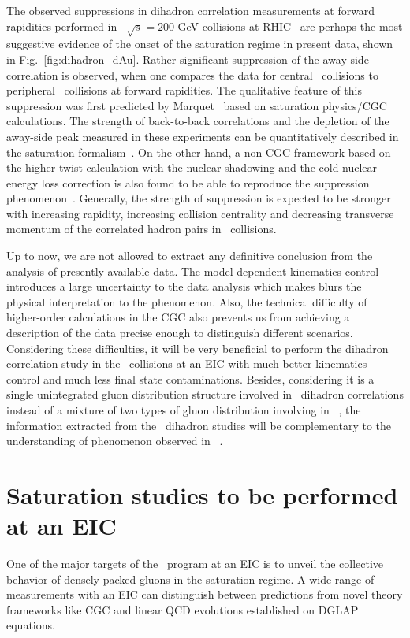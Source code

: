 The observed suppressions in dihadron correlation measurements at forward
rapidities performed in \dA\ $\sqrt{s}=200$ GeV collisions at
RHIC~\cite{Adare:2011sc,Braidot:2010ig,Li:2012bn} are perhaps the most
suggestive evidence of the onset of the saturation regime in present data, shown
in Fig.~\ref{fig:dihadron_dAu}. Rather significant suppression of the away-side
correlation is observed, when one compares the data for central \dA\ collisions
to peripheral \dA\ collisions at forward rapidities. The qualitative feature of
this suppression was first predicted by Marquet~\cite{Marquet:2007vb} based on
saturation physics/CGC calculations. The strength of back-to-back correlations
and the depletion of the away-side peak measured in these experiments can be
quantitatively described in the saturation
formalism~\cite{Albacete:2010pg,Stasto:2011ru,Lappi:2012nh}. On the other hand,
a non-CGC framework based on the higher-twist calculation with the nuclear shadowing and the
cold nuclear energy loss correction is also found to be able to reproduce the
suppression phenomenon~\cite{Kang:2011bp}. Generally, the strength of suppression
is expected to be stronger with increasing rapidity, increasing collision centrality
and decreasing transverse momentum of the correlated hadron pairs in \dA\ collisions.


Up to now, we are not allowed to extract any definitive conclusion from the
analysis of presently available data. The model dependent kinematics control
introduces a large uncertainty to the data analysis which makes blurs the
physical interpretation to the phenomenon. Also, the technical difficulty of
higher-order calculations in the CGC also prevents us from achieving a
description of the data precise enough to distinguish different scenarios.
Considering these difficulties, it will be very beneficial to perform the
dihadron correlation study in the \eA\ collisions at an EIC with much better
kinematics control and much less final state contaminations. Besides,
considering it is a single unintegrated gluon distribution structure involved in
\eA\ dihadron correlations instead of a mixture of two types of gluon distribution
involving in \dA\ , the information extracted from the \eA\ dihadron studies will
be complementary to the understanding of phenomenon observed in \dA\ .



\section{Saturation studies to be performed at an EIC} \label{sec:eic_eA_physics}
One of the major targets of the \eA\ program at an EIC is to unveil the collective behavior of densely packed gluons in the saturation regime.
A wide range of measurements with an EIC can distinguish between predictions from novel theory frameworks like CGC and linear QCD evolutions established on DGLAP equations. 

